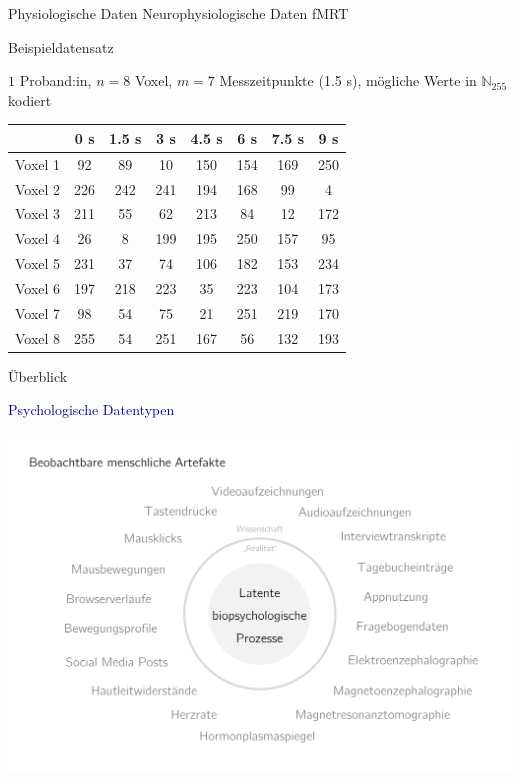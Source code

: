 \documentclass[
  8pt,
  ignorenonframetext,
]{beamer}
\begin{document}
\begin{frame}{Physiologische Daten}
\protect\hypertarget{physiologische-daten-10}{}
Neurophysiologische Daten \textbar{} fMRT

\small

Beispieldatensatz

\footnotesize
\vspace{1mm}

\(1\) Proband:in, \(n = 8\) Voxel, \(m = 7\) Messzeitpunkte (1.5 s),
mögliche Werte in \(\mathbb{N}_{255}\) kodiert \vspace{1mm}

\begin{longtable}[]{@{}lccccccc@{}}
\toprule()
& 0 s & 1.5 s & 3 s & 4.5 s & 6 s & 7.5 s & 9 s \\
\midrule()
\endhead
Voxel 1 & 92 & 89 & 10 & 150 & 154 & 169 & 250 \\
Voxel 2 & 226 & 242 & 241 & 194 & 168 & 99 & 4 \\
Voxel 3 & 211 & 55 & 62 & 213 & 84 & 12 & 172 \\
Voxel 4 & 26 & 8 & 199 & 195 & 250 & 157 & 95 \\
Voxel 5 & 231 & 37 & 74 & 106 & 182 & 153 & 234 \\
Voxel 6 & 197 & 218 & 223 & 35 & 223 & 104 & 173 \\
Voxel 7 & 98 & 54 & 75 & 21 & 251 & 219 & 170 \\
Voxel 8 & 255 & 54 & 251 & 167 & 56 & 132 & 193 \\
\bottomrule()
\end{longtable}
\end{frame}

\begin{frame}{Überblick}
\protect\hypertarget{uxfcberblick-9}{}
\vspace{2mm}

\textcolor{darkblue}{Psychologische Datentypen} \vspace{-2mm}

\begin{center}\includegraphics[width=1\linewidth]{3_Abbildungen/pfm_3_psychologische_daten} \end{center}
\end{frame}
\end{document}
